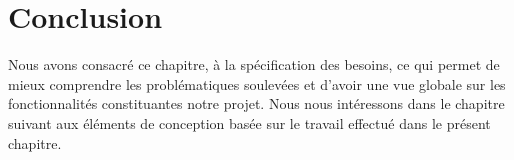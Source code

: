 \section*{Conclusion}

\qquad Nous avons consacré ce chapitre, à la spécification des besoins, ce qui permet de mieux comprendre les problématiques soulevées et d’avoir une vue globale sur les fonctionnalités constituantes notre projet. Nous nous intéressons dans le chapitre suivant aux éléments de conception basée sur le travail effectué dans le présent chapitre.